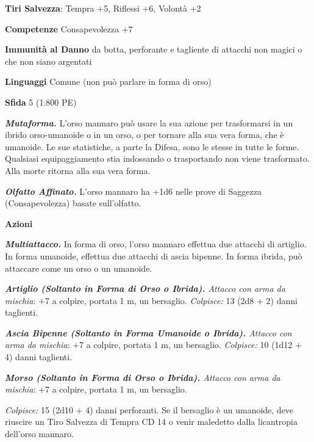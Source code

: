 \begin{multicols}{2}
\textbf{Tiri Salvezza}:  Tempra +5, Riflessi +6, Volontà +2

\textbf{Competenze} Consapevolezza +7

\textbf{Immunità al Danno} da botta, perforante e tagliente di attacchi non magici o che non siano argentati

\textbf{Linguaggi} Comune (non può parlare in forma di orso)

\textbf{Sfida} 5 (1.800 PE)

\emph{\textbf{Mutaforma.}} L'orso mannaro può usare la sua azione per trasformarsi in un ibrido orso-umanoide o in un orso, o per tornare alla sua vera forma, che è umanoide. Le sue statistiche, a parte la Difesa, sono le stesse in tutte le forme. Qualsiasi equipaggiamento stia indossando o trasportando non viene trasformato. Alla morte ritorna alla sua vera forma.

\emph{\textbf{Olfatto Affinato.}} L'orso mannaro ha +1d6 nelle prove di Saggezza (Consapevolezza) basate sull'olfatto.

\textbf{Azioni}

\emph{\textbf{Multiattacco.}} In forma di orso, l'orso mannaro effettua due attacchi di artiglio. In forma umanoide, effettua due attacchi di ascia bipenne. In forma ibrida, può attaccare come un orso o un umanoide.  

\emph{\textbf{Artiglio (Soltanto in Forma di Orso o Ibrida).} Attacco con arma da mischia}: +7 a colpire, portata 1 m, un bersaglio. \emph{Colpisce:} 13 (2d8 + 2) danni taglienti.

\emph{\textbf{Ascia Bipenne (Soltanto in Forma Umanoide o Ibrida).} Attacco con arma da mischia}: +7 a colpire, portata 1 m, un bersaglio. \emph{Colpisce:} 10 (1d12 + 4) danni taglienti.

\emph{\textbf{Morso (Soltanto in Forma di Orso o Ibrida).} Attacco con arma da mischia}: +7 a colpire, portata 1 m, un bersaglio.

\emph{Colpisce:} 15 (2d10 + 4) danni perforanti. Se il bersaglio è un umanoide, deve riuscire un Tiro Salvezza di Tempra CD 14 o venir maledetto dalla licantropia dell'orso mannaro.



\end{multicols}
